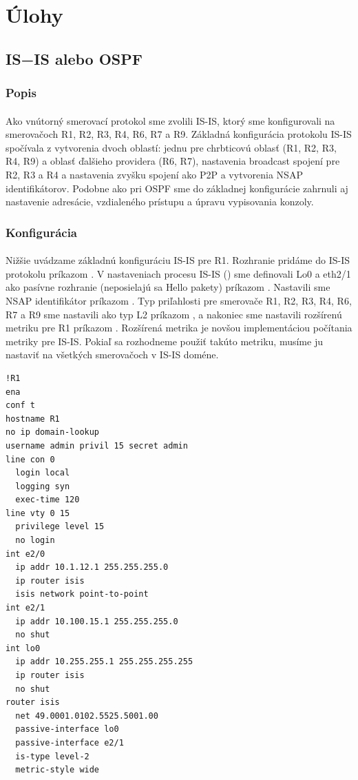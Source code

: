 \documentclass[12pt,twoside,a4paper]{report}
\begin{document}
\section{Úlohy}
\subsection{IS−IS alebo OSPF}
\subsubsection{Popis}
\paragraph{}
Ako vnútorný smerovací protokol sme zvolili IS-IS, ktorý sme konfigurovali na smerovačoch R1, R2, R3, R4, R6, R7 a R9. Základná konfigurácia protokolu IS-IS spočívala z vytvorenia dvoch oblastí: jednu pre chrbticovú oblasť (R1, R2, R3, R4, R9) a oblasť ďalšieho providera (R6, R7), nastavenia broadcast spojení pre R2, R3 a R4 a nastavenia zvyšku spojení ako P2P a vytvorenia NSAP identifikátorov. Podobne ako pri OSPF sme do základnej konfigurácie zahrnuli aj nastavenie adresácie, vzdialeného prístupu a úpravu vypisovania konzoly.

\subsubsection{Konfigurácia}
\paragraph{}
Nižšie uvádzame základnú konfiguráciu IS-IS pre R1. Rozhranie pridáme do IS-IS protokolu príkazom . V nastaveniach procesu IS-IS () sme definovali Lo0 a eth2/1 ako pasívne rozhranie (neposielajú sa Hello pakety) príkazom . Nastavili sme NSAP identifikátor príkazom . Typ priľahlosti pre smerovače R1, R2, R3, R4, R6, R7 a R9 sme nastavili ako typ L2 príkazom , a nakoniec sme nastavili rozšírenú metriku pre R1 príkazom . Rozšírená metrika je novšou implementáciou počítania metriky pre IS-IS. Pokiaľ sa rozhodneme použiť takúto metriku, musíme ju nastaviť na všetkých smerovačoch v IS-IS doméne.

\noindent
{\selectfont
\begin{small}
\begin{verbatim}
!R1
ena
conf t
hostname R1
no ip domain-lookup
username admin privil 15 secret admin
line con 0
  login local
  logging syn
  exec-time 120
line vty 0 15
  privilege level 15
  no login
int e2/0
  ip addr 10.1.12.1 255.255.255.0
  ip router isis
  isis network point-to-point
int e2/1
  ip addr 10.100.15.1 255.255.255.0
  no shut
int lo0
  ip addr 10.255.255.1 255.255.255.255
  ip router isis
  no shut
router isis
  net 49.0001.0102.5525.5001.00
  passive-interface lo0
  passive-interface e2/1
  is-type level-2
  metric-style wide
\end{verbatim}
\end{small}
}
\end{document}

